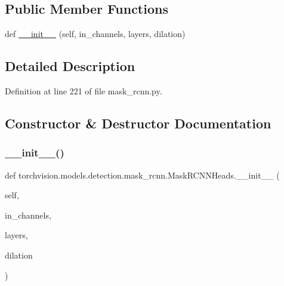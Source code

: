\subsection*{Public Member Functions}
\begin{DoxyCompactItemize}
\item 
def \hyperlink{classtorchvision_1_1models_1_1detection_1_1mask__rcnn_1_1MaskRCNNHeads_a4d409489baebbef8309e36cd05c7eb69}{\+\_\+\+\_\+init\+\_\+\+\_\+} (self, in\+\_\+channels, layers, dilation)
\end{DoxyCompactItemize}


\subsection{Detailed Description}


Definition at line 221 of file mask\+\_\+rcnn.\+py.



\subsection{Constructor \& Destructor Documentation}
\mbox{\label{classtorchvision_1_1models_1_1detection_1_1mask__rcnn_1_1MaskRCNNHeads_a4d409489baebbef8309e36cd05c7eb69}} 
\subsubsection{\texorpdfstring{\+\_\+\+\_\+init\+\_\+\+\_\+()}{\_\_init\_\_()}}
{\footnotesize\ttfamily def torchvision.\+models.\+detection.\+mask\+\_\+rcnn.\+Mask\+R\+C\+N\+N\+Heads.\+\_\+\+\_\+init\+\_\+\+\_\+ (\begin{DoxyParamCaption}\item[{}]{self,  }\item[{}]{in\+\_\+channels,  }\item[{}]{layers,  }\item[{}]{dilation }\end{DoxyParamCaption})}

